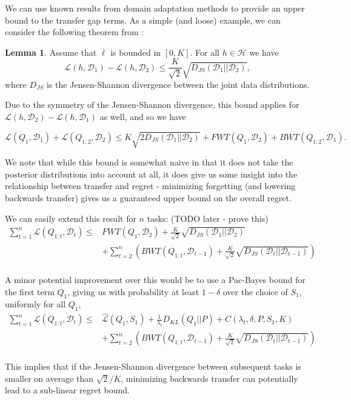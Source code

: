 \documentclass[letterpaper]{article}
\theoremstyle{definition}
\newtheorem{lemma}{Lemma}[section]
\begin{document}
We can use known results from domain adaptation methods to provide an upper bound to the transfer gap terms. As a simple (and loose) example, we can consider the following theorem from \citet{shui2020beyond}:

\begin{lemma}
	Assume that $\ell$ is bounded in $[0, K]$. For all $h\in \mathcal{H}$ we have
	$$\mathcal{L}(h, \mathcal{D}_1)-\mathcal{L}(h, \mathcal{D}_2)\leq \frac{K}{\sqrt{2}}\sqrt{D_{JS}(\mathcal{D}_1||\mathcal{D}_2)},$$ 
	where $D_{JS}$ is the Jensen-Shannon divergence between the joint data distributions.
\end{lemma}

Due to the symmetry of the Jensen-Shannon divergence, this bound applies for $\mathcal{L}(h, \mathcal{D}_2)-\mathcal{L}(h, \mathcal{D}_1)$ as well, and so we have

\begin{equation}
\mathcal{L}(Q_1, \mathcal{D}_1)+\mathcal{L}(Q_{1:2}, \mathcal{D}_2) \leq 
K\sqrt{2 D_{JS}(\mathcal{D}_1||\mathcal{D}_2)}+FWT(Q_1, \mathcal{D}_2)+ BWT(Q_{1:2}, \mathcal{D}_1).
\end{equation}

We note that while this bound is somewhat naive in that it does not take the posterior distributions into account at all, it does give us some insight into the relationship between transfer and regret - minimizing forgetting (and lowering backwards transfer) gives us a guaranteed upper bound on the overall regret. 

We can easily extend this result for $n$ tasks: (TODO later - prove this) %
\begin{equation}
\begin{split}
 \sum_{t=1}^{n}\mathcal{L}(Q_{1:t}, \mathcal{D}_t) \leq &  FWT(Q_1, \mathcal{D}_2) + \frac{K}{\sqrt{2}}\sqrt{D_{JS}(\mathcal{D}_{1}||\mathcal{D}_{2})} \\ &+ \sum_{t=2}^{n}\left ( BWT(Q_{1:t}, \mathcal{D}_{t-1})+ \frac{K}{\sqrt{2}}\sqrt{D_{JS}(\mathcal{D}_{t}||\mathcal{D}_{t-1})}\right ) \\&
 \end{split}
\end{equation}

A minor potential improvement over this would be to use a Pac-Bayes bound for the first term $Q_1$, giving us with probability at least $1-\delta$ over the choice of $S_1$, uniformly for all $Q_1$,
\begin{equation}
\begin{split}
\sum_{t=1}^{n}\mathcal{L}(Q_{1:t}, \mathcal{D}_t) \leq &  \hat{\mathcal{L}}(Q_1, S_1)+\frac{1}{\lambda_t}D_{KL}(Q_1||P)+C(\lambda_t,\delta,P,S_1, K) \\ &+ \sum_{t=2}^{n}\left ( BWT(Q_{1:t}, \mathcal{D}_{t-1})+ \frac{K}{\sqrt{2}}\sqrt{D_{JS}(\mathcal{D}_{t}||\mathcal{D}_{t-1})}\right ) \\&
\end{split}
\end{equation}

This implies that if the Jensen-Shannon divergence between subsequent tasks is smaller on average than $\sqrt{2}/K$, minimizing backwards transfer can potentially lead to a sub-linear regret bound.

\clearpage


\end{document}
